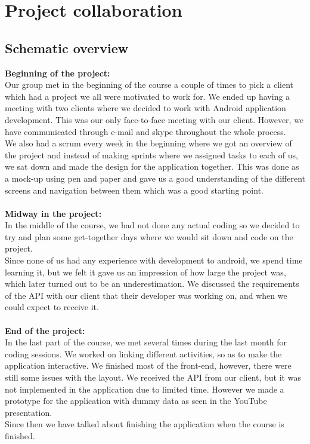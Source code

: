 \documentclass[12pt]{article}
\begin{document}
\section{Project collaboration}
\subsection{Schematic overview}
\textbf{Beginning of the project:}\\
Our group met in the beginning of the course a couple of times to pick a client which had a project we all were motivated to work for. We ended up having a meeting with two clients where we decided to work with Android application development. This was our only face-to-face meeting with our client. However, we have communicated through e-mail and skype throughout the whole process.\\
We also had a scrum every week in the beginning where we got an overview of the project and instead of making sprints where we assigned tasks to each of us, we sat down and made the design for the application together. This was done as a mock-up using pen and paper and gave us a good understanding of the different screens and navigation between them which was a good starting point.\\
\\
\textbf{Midway in the project:}\\
In the middle of the course, we had not done any actual coding so we decided to try and plan some get-together days where we would sit down and code on the project.\\ 
Since none of us had any experience with development to android, we spend time learning it, but we felt it gave us an impression of how large the project was, which later turned out to be an underestimation. We discussed the requirements of the API with our client that their developer was working on, and when we could expect to receive it.\\
\\
\textbf{End of the project:}\\
In the last part of the course, we met several times during the last month for coding sessions. We worked on linking different activities, so as to make the application interactive. We finished most of the front-end, however, there were still some issues with the layout. We received the API from our client, but it was not implemented in the application due to limited time. However we made a prototype for the application with dummy data as seen in the YouTube presentation.\\
Since then we have talked about finishing the application when the course is finished.
\end{document}
